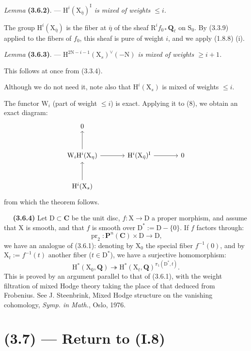 \documentclass[11pt,leqno]{article}
\newcommand{\Page}[1]{\ifvmode\noindent\else\unskip\ \fi{\footnotesize\textcolor{gray}{[p.\,#1]}}\ \ignorespaces}
\begin{document}
\textit{Lemma} \textbf{(3.6.2)}. — \textit{\(\mathrm H^i(\mathrm X_{\bar\eta})^{\mathrm I}\) is mixed of weights \(\leq i\).}

The group \(\mathrm H^i(\mathrm X_{\bar\eta})\) is the fiber at \(\bar\eta\) of the sheaf \(\mathrm R^if_{0*}\mathbf Q_\ell\) on \(\mathrm S_0\). By (3.3.9) applied to the fibers of \(f_0\), this sheaf is pure of weight \(i\), and we apply (1.8.8) (i).

\textit{Lemma} \textbf{(3.6.3)}. — \textit{\(\mathrm H^{2\mathrm N-i-1}(\mathrm X_s)^{\vee}(-\mathrm N)\) is mixed of weights \(\geq i+1\).}

This follows at once from (3.3.4).

Although we do not need it, note also that \(\mathrm H^i(\mathrm X_s)\) is mixed of weights \(\leq i\).

The functor \(\mathrm W_i\) (part of weight \(\leq i\)) is exact. Applying it to (8), we obtain an exact diagram:
\[
\begin{tikzcd}[column sep=large,row sep=large]
0 & & \\
\mathrm W_i\mathrm H^i(\mathrm X_\eta) \arrow[u] \arrow[r] &
\mathrm H^i(\mathrm X_{\bar\eta})^{\mathrm I} \arrow[r] & 0 \\
\mathrm H^i(\mathrm X_s) \arrow[u] & &
\end{tikzcd}
\]
from which the theorem follows.

\Page{215}
\textbf{(3.6.4)} Let \(\mathrm D\subset\mathbf C\) be the unit disc, \(f:\mathrm X\to\mathrm D\) a proper morphism, and assume that \(\mathrm X\) is smooth, and that \(f\) is smooth over \(\mathrm D^*:=\mathrm D-\{0\}\). If \(f\) factors through:
\[
\operatorname{pr}_2:\mathbf P^n(\mathbf C)\times\mathrm D\to\mathrm D,
\]
we have an analogue of (3.6.1): denoting by \(\mathrm X_0\) the special fiber \(f^{-1}(0)\), and by \(\mathrm X_t:=f^{-1}(t)\) another fiber (\(t\in\mathrm D^*\)), we have a surjective homomorphism:
\[
\mathrm H^*(\mathrm X_0,\mathbf Q)\twoheadrightarrow
\mathrm H^*(\mathrm X_t,\mathbf Q)^{\pi_1(\mathrm D^*,t)}.
\]
This is proved by an argument parallel to that of (3.6.1), with the weight filtration of mixed Hodge theory taking the place of that deduced from Frobenius. See J. Steenbrink, Mixed Hodge structure on the vanishing cohomology, \textit{Symp. in Math.}, Oslo, 1976.

\section*{(3.7) — Return to (I.8)}
\end{document}
